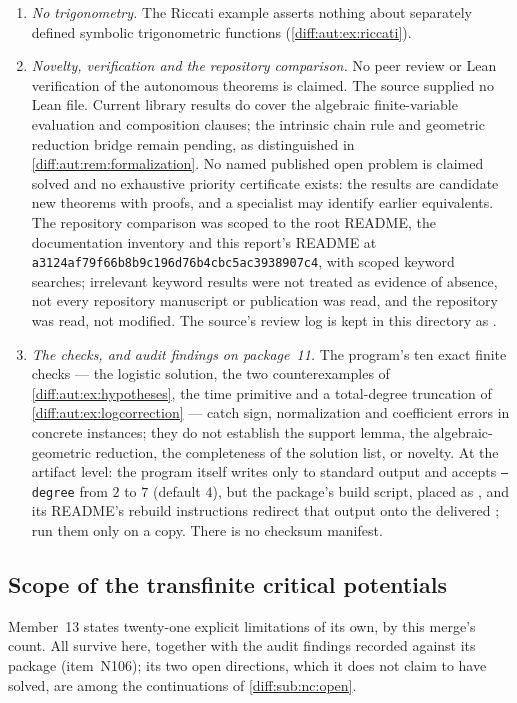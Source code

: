 \documentclass[11pt,letterpaper]{article}
\numberwithin{equation}{section}
\theoremstyle{definition}
\theoremstyle{remark}
\newcommand{\CommitC}{\nolinkurl{a3124af79f66b8b9c196d76b4cbc5ac3938907c4}}
\begin{document}
\begin{enumerate}[label=\textup{N\arabic*.},leftmargin=3.0em,itemsep=0.35em,start=80]
of all surreal supports is used as a set (\cref{diff:aut:rem:formalization}).
\item \emph{No trigonometry.} The Riccati example asserts nothing about
separately defined symbolic trigonometric functions
(\cref{diff:aut:ex:riccati}).
\item \emph{Novelty, verification and the repository comparison.} No peer
review or Lean verification of the autonomous theorems is claimed.
The source supplied no Lean file. Current library results do cover the
algebraic finite-variable evaluation and composition clauses; the
intrinsic chain rule and geometric reduction bridge remain pending,
as distinguished in \cref{diff:aut:rem:formalization}. No named published open problem is claimed solved and no
exhaustive priority certificate exists: the results are candidate new theorems
with proofs, and a specialist may identify earlier equivalents. The repository
comparison was scoped to the root README, the documentation inventory and this
report's README at \CommitC, with scoped keyword searches; irrelevant keyword
results were not treated as evidence of absence, not every repository manuscript
or publication was read, and the repository was read, not modified. The source's
review log is kept in this directory as
.
\item \emph{The checks, and audit findings on package~11.} The program's ten
exact finite checks --- the logistic solution, the two counterexamples of
\cref{diff:aut:ex:hypotheses}, the time primitive and a total-degree truncation
of \cref{diff:aut:ex:logcorrection} --- catch sign, normalization and coefficient
errors in concrete instances; they do not establish the support lemma, the
algebraic-geometric reduction, the completeness of the solution list, or
novelty. At the artifact level: the program itself writes only to standard
output and accepts \texttt{--degree} from $2$ to $7$ (default $4$), but the
package's build script, placed as ,
and its README's rebuild instructions redirect that output onto the delivered
; run them only on a copy. There is no checksum manifest.
\end{enumerate}

\subsection{Scope of the transfinite critical potentials}
\label{diff:cp:sub:nc}

Member~13 states twenty-one explicit limitations of its own, by this merge's
count. All survive here, together with the audit findings recorded against its
package (item~N106); its two open directions, which it does not claim to have
solved, are among the continuations of \cref{diff:sub:nc:open}.
\end{document}
